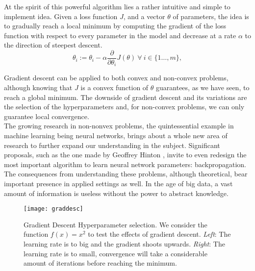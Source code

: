 \documentclass{article}
\begin{document}
	At the spirit of this powerful algorithm lies a rather intuitive and simple to implement idea. Given a loss function $J$, and a vector $\theta$ of parameters, the idea is to gradually reach a local minimum by computing the gradient of the loss function with respect to every parameter in the model and decrease at a rate $\alpha$ to the direction of steepest descent.  
	\begin{equation}
		\theta_i :=\theta_i - \alpha \frac{\partial}{\partial \theta_i} J(\theta) \ \forall \ i \in \{1 \ldots, m\},
	\end{equation}
	
	Gradient descent can be applied to both convex and non-convex problems, although knowing that $J$ is a convex function of $\theta$ guarantees, as we have seen, to reach a global minimum. The downside of gradient descent and its variations are the selection of the hyperparameters and, for non-convex problems, we can only guarantee local convergence.\\
	
	The growing research in non-nonvex problems, the quintessential example in machine learning being neural networks, brings about a whole new area of research to further expand our understanding in the subject. Significant proposals, such as the one made by Geoffrey Hinton \cite{levine}, invite to even redesign the most important algorithm to learn neural network parameters: backpropagation. \\
	
	The consequences from understanding these problems, although theoretical, bear important presence in applied settings as well. In the age of big data, a vast amount of information is useless without the power to abstract knowledge.
	
	
	\begin{figure}
		\centering
		\texttt{[image: graddesc]}
		\caption{Gradient Descent Hyperparameter selection. We consider the function $f(x) = x^2$ to test the effects of gradient descent. \textit{Left}: The learning rate is to big and the gradient shoots upwards. \textit{Right}: The learning rate is to small, convergence will take a considerable amount of iterations before reaching the minimum.}
		\label{fig:graddesc}
	\end{figure}
	
\nocite{*}

\end{document}
